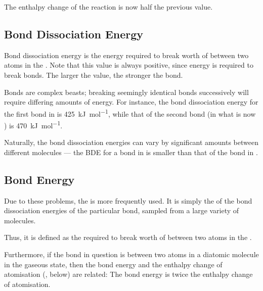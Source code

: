 
			The enthalpy change of the reaction is now half the previous value.


		\pagebreak
		\subsection{Bond Dissociation Energy}

			Bond dissociation energy is the energy required to break  worth of  between two atoms in the
			. Note that this value is always positive, since energy is required to break bonds. The larger the value,
			the stronger the bond.

			Bonds are complex beasts; breaking seemingly identical bonds successively will require differing amounts of energy. For instance, the
			bond dissociation energy for the first  bond in  is \SI{425}{\kilo\joule\per\mole}, while that of the second 
			bond (in what is now ) is \SI{470}{\kilo\joule\per\mole}.

			Naturally, the bond dissociation energies can vary by significant amounts between different molecules --- the BDE for a  bond
			in  is smaller than that of the  bond in .


		\subsection{Bond Energy}

			Due to these problems, the  is more frequently used. It is simply the  of the bond dissociation
			energies of the particular bond, sampled from a large variety of molecules.

			Thus, it is defined as the  required to break  worth of  between two
			atoms in the .

			Furthermore, if the bond in question is between two atoms in a diatomic molecule in the gaseous state, then the bond energy and
			the enthalpy change of atomisation (, below) are related: The bond energy is twice the enthalpy change of atomisation.

